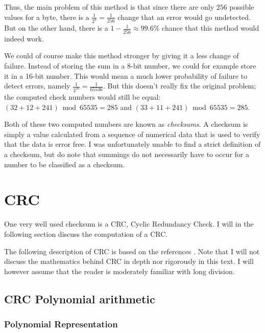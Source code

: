 Thus, the main problem of this method is that since there are only
$256$ possible values for a byte, there is a $\frac{1}{2^8} =
\frac{1}{256}$ change that an error would go undetected. But on the
other hand, there is a $1 - \frac{1}{256} \approx 99.6\%$ chance that
this method would indeed work.

We could of course make this method stronger by giving it a less
change of failure. Instead of storing the sum in a 8-bit number, we
could for example store it in a 16-bit number. This would mean a much
lower probability of failure to detect errors, namely
$\frac{1}{2^{16}} = \frac{1}{65536}$. But this doesn't really fix the
original problem; the computed check numbers would still be equal:
$(32 + 12 + 241) \bmod 65535 = 285$ and $(33 + 11 + 241) \bmod 65535 =
285$.

Both of these two computed numbers are known as \textit{checksums}. A
checksum is simply a value calculated from a sequence of numerical
data that is used to verify that the data is error free. I was
unfortunately unable to find a strict definition of a checksum, but do
note that summings do not necessarily have to occur for a number to be
classified as a checksum.

\section{CRC}

One very well used checksum is a CRC, Cyclic Redundancy Check. I will
in the following section discuss the computation of a CRC.

The following description of CRC is based on the references
\cite{Ritter:1986:GCM:12647.12648,Williams_1993_crc_painless,tanenbaum2003computernetworks_crc,Nelson:1992:FVU:135011.135017_crc32,Stigge06reversingcrc,barr:_crc_implem_code_c,black:_fast_crc32_softw,geremia99:_cyclic}. Note
that I will not discuss the mathematics behind CRC in depth nor
rigorously in this text. I will however assume that the reader is
moderately familiar with long division.

\subsection{CRC Polynomial arithmetic}

\subsubsection{Polynomial Representation}

